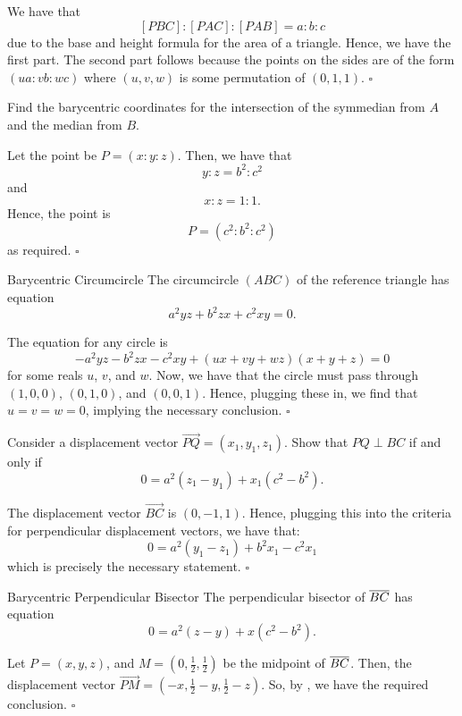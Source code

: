 \documentclass{article}
\begin{document}
We have that \[[PBC] : [PAC] : [PAB] = a : b : c\] due to the base and height formula for the area of a triangle. Hence, we have the first part. The second part follows because the points on the sides are of the form $(ua : vb : wc)$ where $(u, v, w)$ is some permutation of $(0, 1, 1)$. $\square$

\begin{problem}[7.9]{}
Find the barycentric coordinates for the intersection of the symmedian from $A$ and the median from $B$.
\end{problem}

Let the point be $P = (x : y : z)$. Then, we have that \[y : z = b^2 : c^2\] and \[x : z = 1 : 1.\] Hence, the point is \[P = \boxed{(c^2 : b^2 : c^2)}\] as required. $\square$

\begin{problem}[7.17]{Barycentric Circumcircle}
The circumcircle $(ABC)$ of the reference triangle has equation \[a^2yz + b^2zx + c^2xy = 0.\]
\end{problem}

The equation for any circle is \[-a^2yz-b^2zx-c^2xy+(ux+vy+wz)(x+y+z) = 0\] for some reals $u$, $v$, and $w$. Now, we have that the circle must pass through $(1, 0, 0)$, $(0, 1, 0)$, and $(0, 0, 1)$. Hence, plugging these in, we find that $u = v = w = 0$, implying the necessary conclusion. $\square$

\begin{problem}[7.18]{}
Consider a displacement vector $\overrightarrow{PQ} = (x_1, y_1, z_1)$. Show that $PQ \perp BC$ if and only if \[0 = a^2(z_1 - y_1) + x_1(c^2 - b^2).\]
\end{problem}

The displacement vector $\overrightarrow{BC}$ is $(0, -1, 1)$. Hence, plugging this into the criteria for perpendicular displacement vectors, we have that: \[0 = a^2(y_1-z_1)+b^2x_1-c^2x_1\] which is precisely the necessary statement. $\square$

\begin{problem}[7.19]{Barycentric Perpendicular Bisector}
The perpendicular bisector of $\overline{BC}$ has equation \[0 = a^2(z - y) + x(c^2 - b^2).\]
\end{problem}

Let $P = (x, y, z)$, and $M = \left(0, \tfrac{1}{2}, \tfrac{1}{2}\right)$ be the midpoint of $\overline{BC}$. Then, the displacement vector $\overrightarrow{PM} = \left(-x, \tfrac{1}{2}-y, \tfrac{1}{2}-z\right)$. So, by , we have the required conclusion. $\square$
\end{document}
